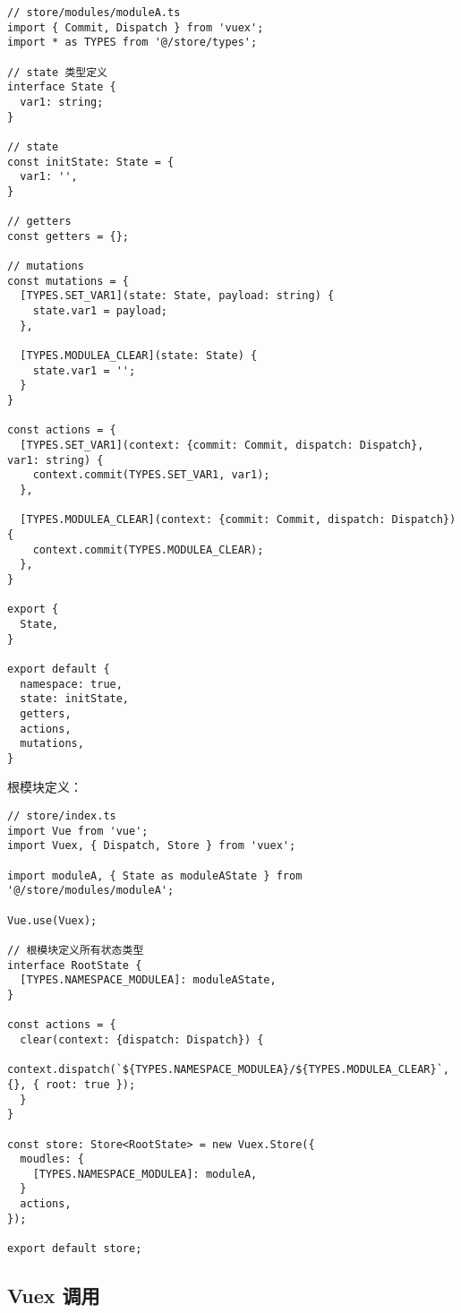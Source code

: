 \begin{lstlisting}
// store/modules/moduleA.ts
import { Commit, Dispatch } from 'vuex';
import * as TYPES from '@/store/types';

// state 类型定义
interface State {
  var1: string;
}

// state
const initState: State = {
  var1: '',
}

// getters
const getters = {};

// mutations
const mutations = {
  [TYPES.SET_VAR1](state: State, payload: string) {
    state.var1 = payload;
  },

  [TYPES.MODULEA_CLEAR](state: State) {
    state.var1 = '';
  }
}

const actions = {
  [TYPES.SET_VAR1](context: {commit: Commit, dispatch: Dispatch}, var1: string) {
    context.commit(TYPES.SET_VAR1, var1);
  },

  [TYPES.MODULEA_CLEAR](context: {commit: Commit, dispatch: Dispatch}) {
    context.commit(TYPES.MODULEA_CLEAR);
  },
}

export {
  State,
}

export default {
  namespace: true,
  state: initState,
  getters,
  actions,
  mutations,
}
\end{lstlisting}

根模块定义：

\begin{lstlisting}
// store/index.ts
import Vue from 'vue';
import Vuex, { Dispatch, Store } from 'vuex';

import moduleA, { State as moduleAState } from '@/store/modules/moduleA';

Vue.use(Vuex);

// 根模块定义所有状态类型
interface RootState {
  [TYPES.NAMESPACE_MODULEA]: moduleAState,
}

const actions = {
  clear(context: {dispatch: Dispatch}) {
    context.dispatch(`${TYPES.NAMESPACE_MODULEA}/${TYPES.MODULEA_CLEAR}`, {}, { root: true });
  }
}

const store: Store<RootState> = new Vuex.Store({
  moudles: {
    [TYPES.NAMESPACE_MODULEA]: moduleA,
  }
  actions,
});

export default store;
\end{lstlisting}

\subsection{Vuex 调用}\label{vuex-ux8c03ux7528}

